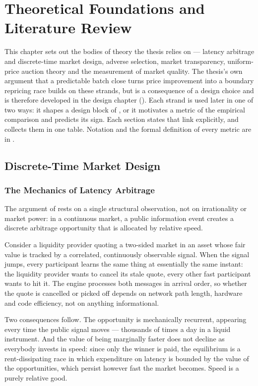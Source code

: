 \chapter{Theoretical Foundations and Literature Review}
\label{ch:foundations}

This chapter sets out the bodies of theory the thesis relies on --- latency
arbitrage and discrete-time market design, adverse selection, market
transparency, uniform-price auction theory and the measurement of market
quality. The thesis's own argument that a predictable batch close turns
price improvement into a boundary repricing race builds on these strands,
but is a consequence of a design choice and is therefore developed in the
design chapter (). Each strand is used later
in one of two ways: it shapes a design block of , or it
motivates a metric of the empirical comparison and predicts its sign. Each
section states that link explicitly, and  collects
them in one table. Notation and the formal definition of every metric are
in .

\section{Discrete-Time Market Design}
\label{sec:discretetime}

\subsection{The Mechanics of Latency Arbitrage}

The argument of \citet{budish2015hft} rests on a single structural
observation, not on irrationality or market power: in a continuous
market, a public information event creates a discrete arbitrage
opportunity that is allocated by relative speed.

Consider a liquidity provider quoting a two-sided market in an asset
whose fair value is tracked by a correlated, continuously observable
signal. When the signal jumps, every participant learns the same thing at
essentially the same instant: the liquidity provider wants to cancel its
stale quote, every other fast participant wants to hit it. The engine
processes both messages in arrival order, so whether the quote is
cancelled or picked off depends on network path length, hardware and code
efficiency, not on anything informational.

Two consequences follow. The opportunity is mechanically recurrent,
appearing every time the public signal moves --- thousands of times a day
in a liquid instrument. And the value of being marginally faster does not
decline as everybody invests in speed: since only the winner is paid, the
equilibrium is a rent-dissipating race in which expenditure on latency is
bounded by the value of the opportunities, which persist however fast the
market becomes. Speed is a purely relative good.

